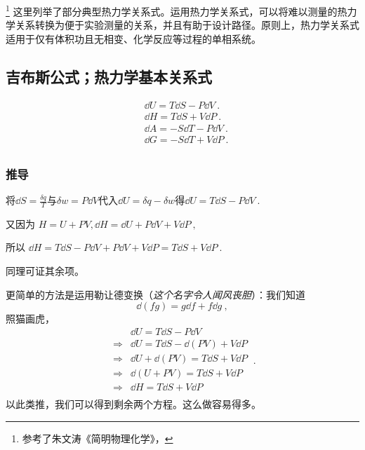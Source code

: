 
\footnote{参考了朱文涛《简明物理化学》，}
这里列举了部分典型热力学关系式。运用热力学关系式，可以将难以测量的热力学关系转换为便于实验测量的关系，并且有助于设计路径。原则上，热力学关系式适用于仅有体积功且无相变、化学反应等过程的单相系统。

\subsection{吉布斯公式；热力学基本关系式}
\begin{align}\label{eq_MWRel_4}
&\dd U = T \dd S - P \dd V~.\\
&\dd H = T \dd S + V \dd P~.\\
&\dd A = -S \dd T - P \dd V~.\\
&\dd G = -S \dd T +V \dd P~.\\
\end{align}

\subsubsection{推导}
将$\dd S = \frac{\delta q}{T}$与$\delta w = P\dd V$代入$\dd U=\delta q-\delta w$得$\dd U = T \dd S - P \dd V~.$

又因为 $H=U+PV, \dd H = \dd U + P \dd V + V \dd P~,$

所以 $\dd H = T \dd S - P \dd V+ P \dd V + V \dd P = T \dd S + V \dd P~.$

同理可证其余项。

更简单的方法是运用勒让德变换（\textsl{这个名字令人闻风丧胆}）：我们知道
$$\dd (fg) = g \dd f + f \dd g~,$$
照猫画虎，
$$
\begin{aligned}
& \dd U = T \dd S - P \dd V \\
\Rightarrow
&\dd U = T \dd S - \dd (PV) + V \dd P \\
\Rightarrow
&\dd U + \dd (PV) =  T \dd S+ V \dd P\\
\Rightarrow
&\dd (U+PV) =  T \dd S + V \dd P\\
\Rightarrow
&\dd H = T \dd S + V \dd P\\
\end{aligned}
~.
$$
以此类推，我们可以得到剩余两个方程。这么做容易得多。

